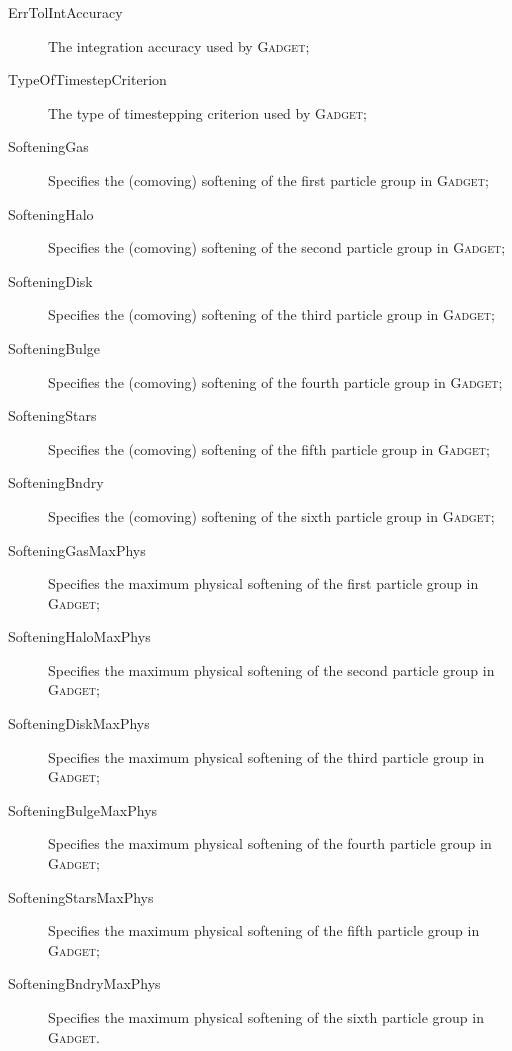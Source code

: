 \begin{description}
 \item [{\normalfont \ttfamily ErrTolIntAccuracy}] The integration accuracy used by {\normalfont \scshape Gadget};
 \item [{\normalfont \ttfamily TypeOfTimestepCriterion}] The type of timestepping criterion used by {\normalfont \scshape Gadget};
 \item [{\normalfont \ttfamily SofteningGas}] Specifies the (comoving) softening of the first particle group in {\normalfont \scshape Gadget};
 \item [{\normalfont \ttfamily SofteningHalo}] Specifies the (comoving) softening of the second particle group in {\normalfont \scshape Gadget};
 \item [{\normalfont \ttfamily SofteningDisk}] Specifies the (comoving) softening of the third particle group in {\normalfont \scshape Gadget};
 \item [{\normalfont \ttfamily SofteningBulge}] Specifies the (comoving) softening of the fourth particle group in {\normalfont \scshape Gadget};
 \item [{\normalfont \ttfamily SofteningStars}] Specifies the (comoving) softening of the fifth particle group in {\normalfont \scshape Gadget};
 \item [{\normalfont \ttfamily SofteningBndry}] Specifies the (comoving) softening of the sixth particle group in {\normalfont \scshape Gadget};
 \item [{\normalfont \ttfamily SofteningGasMaxPhys}] Specifies the maximum physical softening of the first particle group in {\normalfont \scshape Gadget};
 \item [{\normalfont \ttfamily SofteningHaloMaxPhys}] Specifies the maximum physical softening of the second particle group in {\normalfont \scshape Gadget};
 \item [{\normalfont \ttfamily SofteningDiskMaxPhys}] Specifies the maximum physical softening of the third particle group in {\normalfont \scshape Gadget};
 \item [{\normalfont \ttfamily SofteningBulgeMaxPhys}] Specifies the maximum physical softening of the fourth particle group in {\normalfont \scshape Gadget};
 \item [{\normalfont \ttfamily SofteningStarsMaxPhys}] Specifies the maximum physical softening of the fifth particle group in {\normalfont \scshape Gadget};
 \item [{\normalfont \ttfamily SofteningBndryMaxPhys}] Specifies the maximum physical softening of the sixth particle group in {\normalfont \scshape Gadget}.
\end{description}

